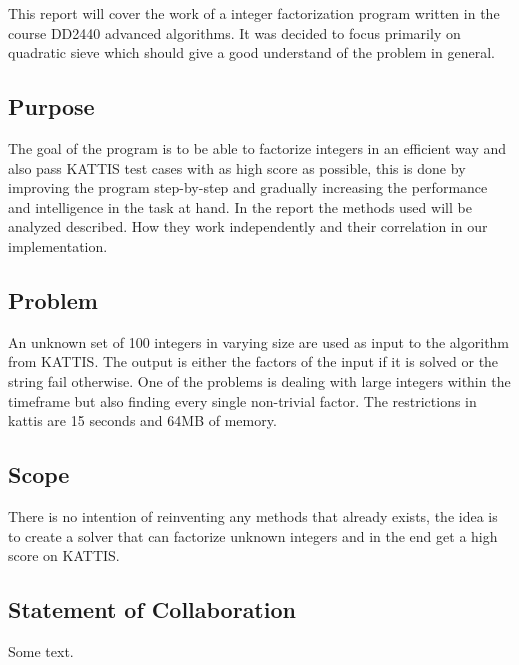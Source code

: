 This report will cover the work of a integer factorization program written in the course DD2440 advanced algorithms. It was decided to focus primarily on quadratic sieve which should give a good understand of the problem in general.

\subsection{Purpose}
The goal of the program is to be able to factorize integers in an efficient way and also pass KATTIS test cases with as high score as possible, this is done by improving the program step-by-step and gradually increasing the performance and intelligence in the task at hand. In the report the methods used will be analyzed described. How they work independently and their correlation in our implementation.

\subsection{Problem}
An unknown set of 100 integers in varying size are used as input to the algorithm from KATTIS. The output is either the factors of the input if it is solved or the string fail otherwise. One of the problems is dealing with large integers within the timeframe but also finding every single non-trivial factor. The restrictions in kattis are 15 seconds and 64MB of memory.

\subsection{Scope}
There is no intention of reinventing any methods that already exists, the idea is to create a solver that can factorize unknown integers and in the end get a high score on KATTIS.

\subsection{Statement of Collaboration}
Some text.